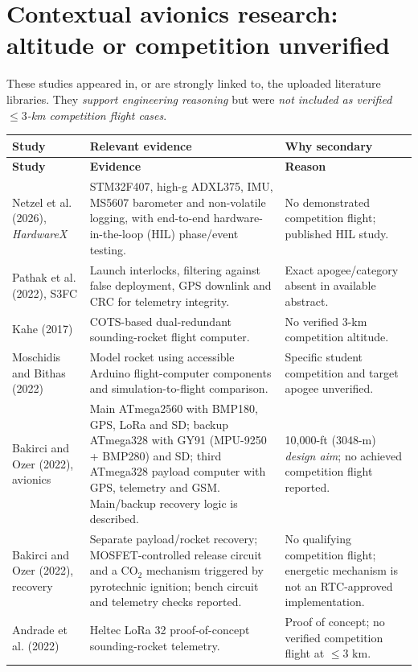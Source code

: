 \documentclass[10pt,a4paper]{article}
\begin{document}
\section{Contextual avionics research: altitude or competition unverified}
These studies appeared in, or are strongly linked to, the uploaded literature libraries. They \emph{support engineering reasoning} but were \emph{not included as verified $\leq3$-km competition flight cases}.
\small
\begin{longtable}{@{}L{45mm}L{69mm}L{28mm}@{}}
\toprule{}\textbf{Study} & \textbf{Relevant evidence} & \textbf{Why secondary}\\\midrule\endfirsthead
\toprule{}\textbf{Study} & \textbf{Evidence} & \textbf{Reason}\\\midrule\endhead
\bottomrule\endlastfoot
Netzel et al. (2026), \emph{HardwareX} \cite{netzel2026} & STM32F407, high-g ADXL375, IMU, MS5607 barometer and non-volatile logging, with end-to-end hardware-in-the-loop (HIL) phase/event testing. & No demonstrated competition flight; published HIL study.\\
Pathak et al. (2022), S3FC \cite{pathak2022} & Launch interlocks, filtering against false deployment, GPS downlink and CRC for telemetry integrity. & Exact apogee/category absent in available abstract.\\
Kahe (2017) \cite{kahe2017} & COTS-based dual-redundant sounding-rocket flight computer. & No verified 3-km competition altitude.\\
Moschidis and Bithas (2022) \cite{moschidis2022} & Model rocket using accessible Arduino flight-computer components and simulation-to-flight comparison. & Specific student competition and target apogee unverified.\\
Bakirci and Ozer (2022), avionics \cite{bakirci2022} & Main ATmega2560 with BMP180, GPS, LoRa and SD; backup ATmega328 with GY91 (MPU-9250 + BMP280) and SD; third ATmega328 payload computer with GPS, telemetry and GSM. Main/backup recovery logic is described. & 10,000-ft (3048-m) \emph{design aim}; no achieved competition flight reported.\\
Bakirci and Ozer (2022), recovery \cite{bakirci2022recovery} & Separate payload/rocket recovery; MOSFET-controlled release circuit and a CO$_2$ mechanism triggered by pyrotechnic ignition; bench circuit and telemetry checks reported. & No qualifying competition flight; energetic mechanism is not an RTC-approved implementation.\\
Andrade et al. (2022) \cite{andrade2022} & Heltec LoRa 32 proof-of-concept sounding-rocket telemetry. & Proof of concept; no verified competition flight at $\leq3$ km.\\
\end{longtable}
\normalsize
\end{document}
